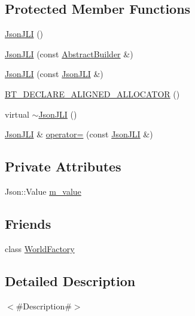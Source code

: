 \subsection*{Protected Member Functions}
\begin{DoxyCompactItemize}
\item 
\mbox{\hyperlink{classnjli_1_1_json_j_l_i_ac22e69325c25f4dec44879499565a229}{Json\+J\+LI}} ()
\item 
\mbox{\hyperlink{classnjli_1_1_json_j_l_i_afdd25a388a00c6c701803f5e8a98f9b8}{Json\+J\+LI}} (const \mbox{\hyperlink{classnjli_1_1_abstract_builder}{Abstract\+Builder}} \&)
\item 
\mbox{\hyperlink{classnjli_1_1_json_j_l_i_acbcc771bf6781df2ece0aae1cfa744e5}{Json\+J\+LI}} (const \mbox{\hyperlink{classnjli_1_1_json_j_l_i}{Json\+J\+LI}} \&)
\item 
\mbox{\hyperlink{classnjli_1_1_json_j_l_i_a1901614b3766d0852be1f7a7ec833751}{B\+T\+\_\+\+D\+E\+C\+L\+A\+R\+E\+\_\+\+A\+L\+I\+G\+N\+E\+D\+\_\+\+A\+L\+L\+O\+C\+A\+T\+OR}} ()
\item 
virtual \mbox{\hyperlink{classnjli_1_1_json_j_l_i_a707b70469f3b0dcd3ee8ac4c0aebaf50}{$\sim$\+Json\+J\+LI}} ()
\item 
\mbox{\hyperlink{classnjli_1_1_json_j_l_i}{Json\+J\+LI}} \& \mbox{\hyperlink{classnjli_1_1_json_j_l_i_a7c5ca5292cb72b9fae301d2c7acde205}{operator=}} (const \mbox{\hyperlink{classnjli_1_1_json_j_l_i}{Json\+J\+LI}} \&)
\end{DoxyCompactItemize}
\subsection*{Private Attributes}
\begin{DoxyCompactItemize}
\item 
Json\+::\+Value \mbox{\hyperlink{classnjli_1_1_json_j_l_i_a3e99d03b130213e9923417753929b4f6}{m\+\_\+value}}
\end{DoxyCompactItemize}
\subsection*{Friends}
\begin{DoxyCompactItemize}
\item 
class \mbox{\hyperlink{classnjli_1_1_json_j_l_i_acb96ebb09abe8f2a37a915a842babfac}{World\+Factory}}
\end{DoxyCompactItemize}


\subsection{Detailed Description}
$<$\#\+Description\#$>$ 

